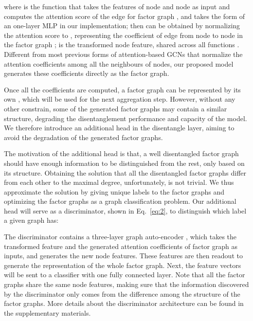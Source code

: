 \documentclass{article}
\begin{document}
where  is the function that takes the features of
node  and node  as input and computes the attention score of the edge
for factor graph , 
and takes the form of  an one-layer MLP
in our implementation; 
 then can be obtained by normalizing the attention score 
to , representing the coefficient of edge from node  to node 
in the factor graph ;
{ is the transformed node feature, shared
across all functions .} Different from most previous 
{forms of attention-based GCNs} that normalize
the attention coefficients among all the neighbours of nodes, 
our proposed model generates these coefficients directly
{as the factor graph}.

Once all the coefficients are computed,
a factor graph  can be represented by its own ,
which will be used for the next aggregation step. 
However, without any other
constrain, some of the generated factor graphs may contain a similar
structure, degrading the disentanglement performance and 
capacity of the model. We therefore introduce an additional
head in the disentangle layer, aiming to avoid the 
degradation of the generated factor graphs.

The motivation of the additional head is that, a well
disentangled factor graph should have enough information to 
be distinguished from the rest, only based on its
structure. 
{Obtaining the solution that all the disentangled
factor graphs differ from each other to the
maximal degree, unfortunately,  is not trivial.}
We thus approximate the solution by 
giving unique labels to the factor graphs
and optimizing the factor graphs
as a graph classification problem. 
Our additional head will serve as a {discriminator, shown in Eq.~\ref{eq:2}}, to distinguish which label a given graph has:
\begin{small}

\end{small}
 
The discriminator contains 
a three-layer graph auto-encoder , which takes the transformed feature
 and the generated attention coefficients of factor graph 
as inputs, and generates the new node features. 
These features are then readout to generate
the representation of the whole factor graph. 
Next, the feature vectors will be sent to
a classifier with one fully connected layer.
Note that all the factor graphs share the 
same {node features}, making sure that the 
information discovered by the discriminator only
comes from the difference among the structure of
the factor graphs.
More details about the discriminator architecture
can be found in the supplementary materials.
\end{document}
